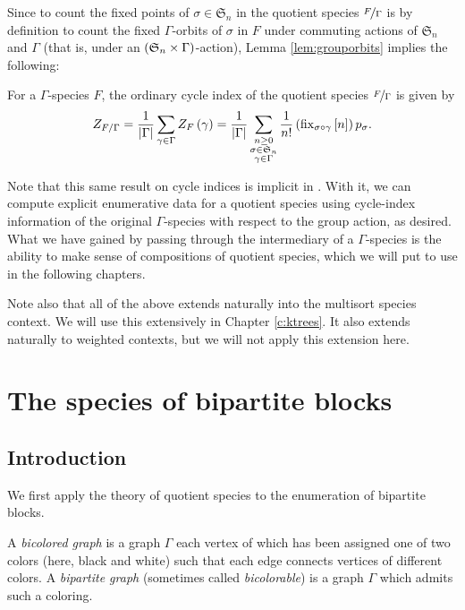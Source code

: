 \documentclass[sectionflow,singlespace,twoside]{brandiss} %
\numberwithin{section}{chapter}
\numberwithin{figure}{chapter}
\begin{document}
Since to count the fixed points of $\sigma \in \mathfrak{S}_{n}$ in the quotient species $\nicefrac{F}{\Gamma}$ is by definition to count the fixed $\Gamma$-orbits of $\sigma$ in $F$ under commuting actions of $\mathfrak{S}_{n}$ and $\Gamma$ (that is, under an $\left( {\mathfrak{S}_{n} \times \Gamma} \right)$-action), Lemma \ref{lem:grouporbits} implies the following:
\begin{theorem}\label{thm:qsci}
  For a $\Gamma$-species $F$, the ordinary cycle index of the quotient species $\nicefrac{F}{\Gamma}$ is given by 
  \begin{equation}
    \label{eq:quotcycind}
    Z_{F / \Gamma} = \frac{1}{\left\vert {\Gamma} \right\vert} \sum_{\gamma \in \Gamma} Z_{F} \left( {\gamma} \right) = \frac{1}{\left\vert {\Gamma} \right\vert} \sum_{\substack{n \geq 0 \\ \sigma \in \mathfrak{S}_{n} \\ \gamma \in \Gamma}} \frac{1}{n!} \left( {\operatorname{fix}_{\sigma \circ \gamma} \left[ {n} \right]} \right) p_{\sigma}.
  \end{equation}
\end{theorem}
Note that this same result on cycle indices is implicit in \cite[\S 2.3]{bous:species}.
With it, we can compute explicit enumerative data for a quotient species using cycle-index information of the original $\Gamma$-species with respect to the group action, as desired.
What we have gained by passing through the intermediary of a $\Gamma$-species is the ability to make sense of compositions of quotient species, which we will put to use in the following chapters.

Note also that all of the above extends naturally into the multisort species context.
We will use this extensively in Chapter \ref{c:ktrees}.
It also extends naturally to weighted contexts, but we will not apply this extension here.

\chapter{The species of bipartite blocks}\label{c:bpblocks}
\section{Introduction}\label{s:bpintro}
We first apply the theory of quotient species to the enumeration of bipartite blocks.

\begin{definition}
  \label{def:bcgraph}
  A \emph{bicolored graph} is a graph $\Gamma$ each vertex of which has been assigned one of two colors (here, black and white) such that each edge connects vertices of different colors.
  A \emph{bipartite graph} (sometimes called \emph{bicolorable}) is a graph $\Gamma$ which admits such a coloring.  
\end{definition}
\end{document}

